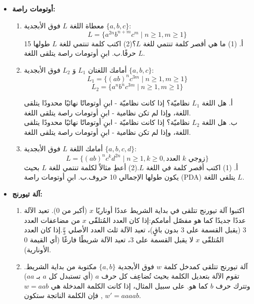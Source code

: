 \documentclass[14pt]{extarticle}
\begin{document}
\pagestyle{empty}
\thispagestyle{empty}

\begin{itemize}
    \item \textbf{أوتومات راصة:}
    \begin{enumerate}
        \item
        معطاة اللغة $L$ فوق الأبجدية $\{a, b, c\}$:$$L = \{ a^{2n} b^{n+m} c^{m} \mid n \ge 1, m \ge 1 \}$$أ. (1) ما هي أقصر كلمة تنتمي للغة $L$؟(2) اكتب كلمة تنتمي للغة $L$ طولها 15 حرفًا.ب. ابنِ أوتومات راصة يتلقى اللغة $L$.

        \item
        أمامك اللغتان $L_1$ وَ $L_2$ فوق الأبجدية $\{a, b, c\}$:
        $$L_1 = \{ (ab)^n c^{3m} \mid n \ge 1, m \ge 1 \}$$
        $$L_2 = \{ a^n b^n c^{3m} \mid n \ge 1, m \ge 1 \}$$

        أ. هل اللغة $L_1$ نظاميّة؟ إذا كانت نظاميّة - ابنِ أوتوماتًا نهائيًا محدودًا يتلقى اللغة، وإذا لم تكن نظامية - ابنِ أوتومات راصة يتلقى اللغة. \\
        ب. هل اللغة $L_2$ نظاميّة؟ إذا كانت نظاميّة - ابنِ أوتوماتًا نهائيًا محدودًا يتلقى اللغة، وإذا لم تكن نظامية - ابنِ أوتومات راصة يتلقى اللغة.

        \item
        أمامك اللغة $L$ فوق الأبجدية $\{a, b, c, d\}$:$$L = \{ (ab)^n c^k d^{2n} \mid n \ge 1, k \ge 0, \text{العدد } k \text{ زوجي} \}$$أ. (1) اكتب أقصر كلمة في اللغة $L$.(2) أعطِ مثالاً لكلمة تنتمي للغة $L$ بحيث يكون طولها الإجمالي 10 حروف.ب. ابنِ أوتومات راصة (PDA) يتلقى اللغة $L$.

    \end{enumerate}

\item \textbf{آلة تيورنج:}

    \begin{enumerate}
        \item
اكتبوا آلة تيورنج تتلقى في بداية الشريط عددًا أوناريًا $x$ (أكبر من 0). تعيد الآلة عددًا جديدًا كما هو مفصّل أمامكم:إذا كان العدد المُتلقّى $x$ من مضاعفات العدد 3 (يقبل القسمة على 3 بدون باقٍ)، تعيد الآلة ثلث العدد الأصلي $\frac{x}{3}$.إذا كان العدد المُتلقّى $x$ لا يقبل القسمة على 3، تعيد الآلة شريطًا فارغًا (أي القيمة 0 الأونارية).

\item
آلة تيورنج تتلقى كمدخل كلمة $w$ فوق الأبجدية $\{a, b\}$ مكتوبة من بداية الشريط.
تقوم الآلة بتعديل الكلمة بحيث تُضاعِف كل حرف $a$ (أي تستبدل كل $a$ بـ $aa$) وتترك حرف $b$ كما هو. على سبيل المثال، إذا كانت الكلمة المدخلة هي $w = aab$, فإن الكلمة الناتجة ستكون $w' = aaaab$.


\end{enumerate}
\end{itemize}
\end{document}

